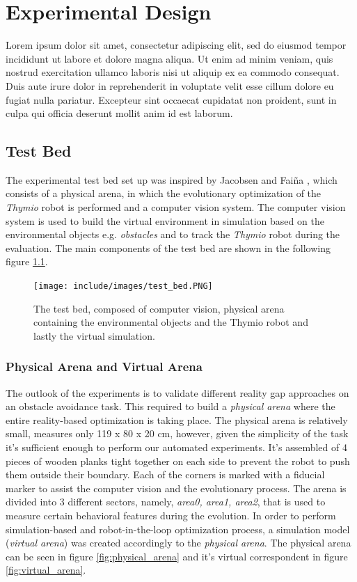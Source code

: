 \chapter{Experimental Design}

Lorem ipsum dolor sit amet, consectetur adipiscing elit, sed do eiusmod tempor incididunt ut labore et dolore magna aliqua. Ut enim ad minim veniam, quis nostrud exercitation ullamco laboris nisi ut aliquip ex ea commodo consequat. Duis aute irure dolor in reprehenderit in voluptate velit esse cillum dolore eu fugiat nulla pariatur. Excepteur sint occaecat cupidatat non proident, sunt in culpa qui officia deserunt mollit anim id est laborum.

\section{Test Bed}
The experimental test bed set up was inspired by Jacobsen and Faiña \citep{faina2017automating}, which consists of a physical arena, in which the evolutionary optimization of the \emph{Thymio} robot is performed and a computer vision system. The computer vision system is used to build the virtual environment in simulation based on the environmental objects e.g. \emph{obstacles} and to track the \emph{Thymio} robot during the evaluation. The main components of the test bed are shown in the following figure \ref{fig:test_bed}.

\begin{figure}[H]
  \centering
  \texttt{[image: include/images/test\_bed.PNG]}
  \caption{The test bed, composed of computer vision, physical arena containing the environmental objects and the Thymio robot and lastly the virtual simulation.}
  \label{fig:test_bed}
\end{figure}

\subsection{Physical Arena and Virtual Arena}

The outlook of the experiments is to validate different reality gap approaches on an obstacle avoidance task. This required to build a \emph{physical arena} where the entire reality-based optimization is taking place. The physical arena is relatively small, measures only 119 x 80 x 20 cm, however, given the simplicity of the task it's sufficient enough to perform our automated experiments. It's assembled of 4 pieces of wooden planks tight together on each side to prevent the robot to push them outside their boundary. Each of the corners is marked with a fiducial marker to assist the computer vision and the evolutionary process. The arena is divided into 3 different sectors, namely, \emph{area0, area1, area2}, that is used to measure certain behavioral features during the evolution. In order to perform simulation-based and robot-in-the-loop optimization process, a simulation model (\emph{virtual arena}) was created accordingly to the \emph{physical arena}. The physical arena can be seen in figure \ref{fig:physical_arena} and it's virtual correspondent in figure \ref{fig:virtual_arena}.


